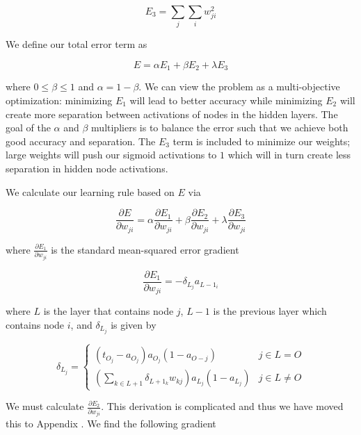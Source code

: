 \begin{equation}
  E_3 = \sum_{j} \sum_{i} w_{ji}^2
\end{equation}

We define our total error term as

\begin{equation}
  E = \alpha E_1 + \beta E_2 + \lambda E_3
\end{equation}

where $0 \leq \beta \leq 1$ and $\alpha = 1 - \beta$.
We can view the problem as a multi-objective optimization:
minimizing $E_1$ will lead to better accuracy while
minimizing $E_2$ will create more separation between activations of
nodes in the hidden layers. The goal of the $\alpha$ and $\beta$
multipliers is to balance the error such that we achieve
both good accuracy and separation. The $E_3$ term is included
to minimize our weights; large weights will push our sigmoid
activations to $1$ which will in turn create less separation in
hidden node activations.

We calculate our learning rule based on $E$ via

\begin{equation}
  \frac{\partial E}{\partial w_{ji}} = \alpha \frac{\partial E_1}{\partial w_{ji}} + \beta \frac{\partial E_2}{\partial w_{ji}} + \lambda \frac{\partial E_3}{\partial w_{ji}}
\end{equation}

where $\frac{\partial E_1}{\partial w_{ji}}$ is the standard mean-squared error gradient

\begin{equation}
  \frac{\partial E_1}{\partial w_{ji}} = -\delta_{L_j}a_{L-1_i} 
\end{equation}

where $L$ is the layer that contains node $j$, $L-1$ is the previous layer
which contains node $i$, and $\delta_{L_j}$ is given by

\begin{equation}
  \delta_{L_j} =
  \begin{cases}
    (t_{O_j} - a_{O_j})a_{O_j}(1-a_{O-j}) & j \in L = O \\
    (\sum_{k \in L+1}{\delta_{L+1_k}w_{kj}})a_{L_j}(1-a_{L_j}) & j \in L \neq O
  \end{cases}
\end{equation}

We must calculate $\frac{\partial E_2}{\partial w_{ji}}$. This derivation is
complicated and thus we have moved this to Appendix
.
We find the following gradient

